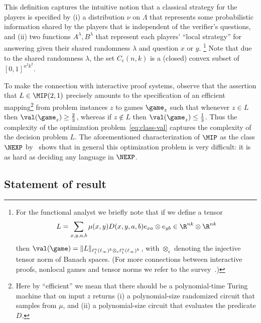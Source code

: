 This definition captures the intuitive notion that a classical strategy for the players is specified by (i) a distribution $\nu$ on $\Lambda$ that represents some probabilistic information shared by the players that is independent of the verifier's questions, and (ii) two functions $A^\lambda,B^\lambda$ that represent each players' ``local strategy'' for answering given their shared randomness $\lambda$ and question $x$ or $y$. \footnote{For the functional analyst we briefly note that if we define a tensor 
\[L  = \sum_{x,y,a,b} \mu(x,y)D(x,y,a,b) e_{xa}\otimes e_{yb} \in \R^{nk}\otimes \R^{nk}\]
then $\val(\game) = \|L\|_{\ell_1^n(\ell_\infty)^k \otimes_\epsilon \ell_1^n(\ell_\infty)^k}$, with $\otimes_\epsilon$ denoting the injective tensor norm of Banach spaces. (For more connections between interactive proofs, nonlocal games and tensor norms we refer to the survey~\cite{palazuelos2016survey}.)} Note that due to the shared randomness $\lambda$, the set $C_c(n,k)$ is a (closed) convex subset of $[0,1]^{n^2k^2}$. 

To make the connection with interactive proof systems, observe that the assertion that $L\in \MIP(2,1)$ precisely amounts to the specification of an efficient mapping\footnote{Here by ``efficient'' we mean that there should be a polynomial-time Turing machine that on input $z$ returns (i) a polynomial-size randomized circuit that samples from $\mu$, and (ii) a polynomial-size circuit that evaluates the predicate $D$.} from problem instances $z$ to games $\game_z$ such that whenever $z\in L$ then  $\val(\game_z) \geq \frac{2}{3}$, whereas if $z \notin L$ then $\val(\game_z) \leq \frac{1}{3}$. Thus the complexity of the optimization problem~\eqref{eq:class-val} captures the complexity of the decision problem $L$. The aforementioned characterization of $\MIP$ as the class $\NEXP$ by~\cite{babai1991non} shows that in general this optimization problem is very difficult: it is as hard as deciding any language in $\NEXP$. 



\subsection{Statement of result}
\label{sec:result}

